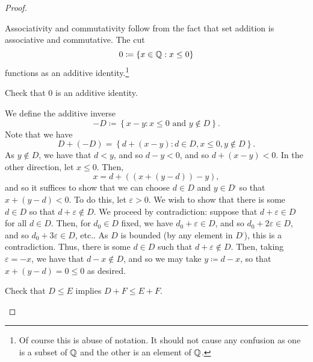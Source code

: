 \begin{thm}
\begin{proof}
\begin{savenotes}
\label{stp1.4.18.6}
Associativity and commutativity follow from the fact that set addition is associative and commutative.  The cut
\begin{equation}
0\coloneqq \left\{ x\in \mathbb{Q} :x\leq 0\right\}
\end{equation}
functions as an additive identity.\footnote{Of course this is abuse of notation.  It should not cause any confusion as one is a subset of $\mathbb{Q}$ and the other is an element of $\mathbb{Q}$.}
\begin{exr}
Check that $0$ is an additive identity.
\end{exr}
We define the additive inverse
\begin{equation}
-D\coloneqq \left\{ x-y:x\leq 0\text{ and }y\notin D\right\} .
\end{equation}
Note that we have
\begin{equation}
D+(-D)=\left\{ d+(x-y):d\in D,x\leq 0,y\notin D\right\} .
\end{equation}
As $y\notin D$, we have that $d<y$, and so $d-y<0$, and so $d+(x-y)<0$.  In the other direction, let $x\leq 0$.  Then,
\begin{equation}
x=d+\left( \left( x+(y-d)\right) -y\right) ,
\end{equation}
and so it suffices to show that we can choose $d\in D$ and $y\in D^{\comp}$ so that $x+(y-d)<0$.  To do this, let $\varepsilon >0$.  We wish to show that there is some $d\in D$ so that $d+\varepsilon \notin D$.  We proceed by contradiction:  suppose that $d+\varepsilon \in D$ for all $d\in D$.  Then, for $d_0\in D$ fixed, we have $d_0+\varepsilon \in D$, and so $d_0+2\varepsilon \in D$, and so $d_0+3\varepsilon \in D$, etc..  As $D$ is bounded (by any element in $D^{\comp}$), this is a contradiction.  Thus, there is some $d\in D$ such that $d+\varepsilon \notin D$.  Then, taking $\varepsilon =-x$, we have that $d-x\notin D$, and so we may take $y\coloneqq d-x$, so that $x+(y-d)=0\leq 0$ as desired.

\begin{exr}
Check that $D\leq E$ implies $D+F\leq E+F$.
\end{exr}


\end{savenotes}
\end{proof}
\end{thm}
